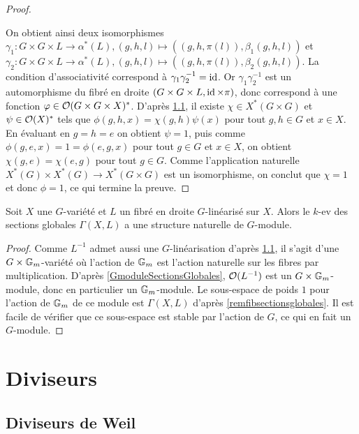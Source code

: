 \begin{proof}
\begin{center}
\begin{tikzcd}
	\end{tikzcd}
	\end{center}
	On obtient ainsi deux isomorphismes $\gamma_1:G\times G\times L\rightarrow\alpha^*(L), (g,h,l)\mapsto ((g,h,\pi(l)), \beta_1(g,h,l))$ et $\gamma_2:G\times G\times L\rightarrow\alpha^*(L), (g,h,l)\mapsto ((g,h,\pi(l)), \beta_2(g,h,l))$. La condition d'associativité correspond à $\gamma_1\gamma_2^{-1}=\id$. Or $\gamma_1\gamma_2^{-1}$ est un automorphisme du fibré en droite $(G\times G\times L,\id\times \pi)$, donc correspond à une fonction $\phi\in \Oo(G\times G\times X)^*$. D'après \ref{}, il existe $\chi\in X^*(G\times G)$ et $\psi\in\Oo(X)^*$ tels que $\phi(g,h,x)=\chi(g,h)\psi(x)$ pour tout $g,h\in G$ et $x\in X$. En évaluant en $g=h=e$ on obtient $\psi=1$, puis comme $\phi(g,e,x)=1=\phi(e,g,x)$ pour tout $g\in G$ et $x\in X$, on obtient $\chi(g,e)=\chi(e,g)$ pour tout $g\in G$. Comme l'application naturelle $X^*(G)\times X^*(G)\rightarrow X^*(G\times G)$ est un isomorphisme, on conclut que $\chi=1$ et donc $\phi=1$, ce qui termine la preuve.
\end{proof}

\begin{prop}\label{GmoduleSectionsGlobalesGlin}
Soit $X$ une $G$-variété et $L$ un fibré en droite $G$-linéarisé sur $X$. Alors le $k$-ev des sections globales $\Gamma(X, L)$ a une structure naturelle de $G$-module.
\end{prop}
\begin{proof}
Comme $L^{-1}$ admet aussi une $G$-linéarisation d'après \ref{}, il s'agit d'une $G\times \GG_m$-variété où l'action de $\GG_m$ est l'action naturelle sur les fibres par multiplication. D'après \ref{GmoduleSectionsGlobales}, $\Oo(L^{-1})$ est un $G\times \GG_m$-module, donc en particulier un $\GG_m$-module. Le sous-espace de poids $1$ pour l'action de $\GG_m$ de ce module est $\Gamma(X, L)$ d'après \ref{remfibsectionsglobales}. Il est facile de vérifier que ce sous-espace est stable par l'action de $G$, ce qui en fait un $G$-module.
\end{proof}

\section{Diviseurs}

\subsection{Diviseurs de Weil}

